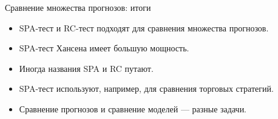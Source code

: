 \begin{frame}{Сравнение множества прогнозов: итоги}

  \begin{itemize}[<+->]
    \item SPA-тест и RC-тест подходят для сравнения \alert{множества} прогнозов. 
    \item \alert{SPA-тест} Хансена имеет большую мощность. 
    \item Иногда названия \alert{SPA} и \alert{RC} путают. 
    \item SPA-тест используют, например, для сравнения \alert{торговых стратегий}. 
    \item Сравнение прогнозов и сравнение моделей — \alert{разные} задачи. 
  \end{itemize}
\end{frame}

